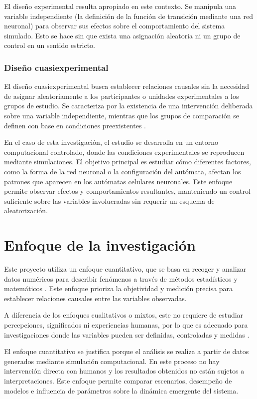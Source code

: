 El diseño experimental resulta apropiado en este contexto. Se manipula una variable independiente (la definición de la función de transición mediante una red neuronal) para observar sus efectos sobre el comportamiento del sistema simulado. Esto se hace sin que exista una asignación aleatoria ni un grupo de control en un sentido estricto. 

\subsubsection{Diseño cuasiexperimental}

El diseño cuasiexperimental busca establecer relaciones causales sin la necesidad de asignar aleatoriamente a los participantes o unidades experimentales a los grupos de estudio. Se caracteriza por la existencia de una intervención deliberada sobre una variable independiente, mientras que los grupos de comparación se definen con base en condiciones preexistentes \cite{capili2024_cuasiexperimento}.

En el caso de esta investigación, el estudio se desarrolla en un entorno computacional controlado, donde las condiciones experimentales se reproducen mediante simulaciones. El objetivo principal es estudiar cómo diferentes factores, como la forma de la red neuronal o la configuración del autómata, afectan los patrones que aparecen en los autómatas celulares neuronales. Este enfoque permite observar efectos y comportamientos resultantes, manteniendo un control suficiente sobre las variables involucradas sin requerir un esquema de aleatorización.

\section{Enfoque de la investigación}

Este proyecto utiliza un enfoque cuantitativo, que se basa en recoger y analizar datos numéricos para describir fenómenos a través de métodos estadísticos y matemáticos \cite{jaen_cuantitativa}. Este enfoque prioriza la objetividad y medición precisa para establecer relaciones causales entre las variables observadas.

A diferencia de los enfoques cualitativos o mixtos, este no requiere de estudiar percepciones, significados ni experiencias humanas, por lo que es adecuado para investigaciones donde las variables pueden ser definidas, controladas y medidas \cite{cueva2023_mixto}.

El enfoque cuantitativo se justifica porque el análisis se realiza a partir de datos generados mediante simulación computacional. En este proceso no hay intervención directa con humanos y los resultados obtenidos no están sujetos a interpretaciones. Este enfoque permite comparar escenarios, desempeño de modelos e influencia de parámetros sobre la dinámica emergente del sistema.

